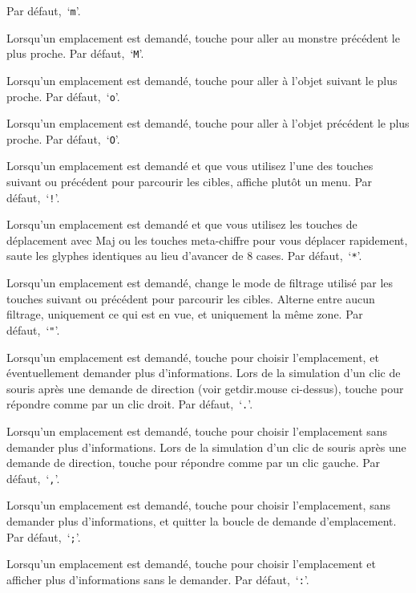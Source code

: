 \documentclass[titlepage]{article}
\begin{document}
\begin{description}[itemindent=10mm, labelwidth=15mm, rightmargin=15mm]
Par défaut,~`\texttt{m}'.
\item[getpos.mon.prev]
Lorsqu'un emplacement est demandé, touche pour aller au monstre précédent le plus proche.
Par défaut,~`\texttt{M}'.
\item[getpos.obj.next]
Lorsqu'un emplacement est demandé, touche pour aller à l'objet suivant le plus proche.
Par défaut,~`\texttt{o}'.
\item[getpos.obj.prev]
Lorsqu'un emplacement est demandé, touche pour aller à l'objet précédent le plus proche.
Par défaut,~`\texttt{O}'.
\item[getpos.menu]
Lorsqu'un emplacement est demandé et que vous utilisez l'une des touches suivant ou
précédent pour parcourir les cibles, affiche plutôt un menu. Par défaut,~`\texttt{!}'.
\item[getpos.moveskip]
Lorsqu'un emplacement est demandé et que vous utilisez les touches de déplacement
avec Maj ou les touches meta-chiffre pour vous déplacer rapidement, saute les
glyphes identiques au lieu d'avancer de 8 cases.
Par défaut,~`\texttt{*}'.
\item[getpos.filter]
Lorsqu'un emplacement est demandé, change le mode de filtrage utilisé par les
touches suivant ou précédent pour parcourir les cibles. Alterne entre aucun
filtrage, uniquement ce qui est en vue, et uniquement la même zone. Par défaut,~`\texttt{"}'.
\item[getpos.pick]
Lorsqu'un emplacement est demandé, touche pour choisir l'emplacement, et éventuellement
demander plus d'informations.
Lors de la simulation d'un clic de souris après une demande de direction (voir
getdir.mouse ci-dessus), touche pour répondre comme par un clic droit.
Par défaut,~`\texttt{.}'.
\item[getpos.pick.once]
Lorsqu'un emplacement est demandé, touche pour choisir l'emplacement sans
demander plus d'informations.
Lors de la simulation d'un clic de souris après une demande de direction,
touche pour répondre comme par un clic gauche.
Par défaut,~`\texttt{,}'.
\item[getpos.pick.quick]
Lorsqu'un emplacement est demandé, touche pour choisir l'emplacement, sans demander
plus d'informations, et quitter la boucle de demande d'emplacement. Par défaut,~`\texttt{;}'.
\item[getpos.pick.verbose]
Lorsqu'un emplacement est demandé, touche pour choisir l'emplacement et afficher plus
d'informations sans le demander. Par défaut,~`\texttt{:}'.
\item[getpos.self]

\end{description}
\end{document}
